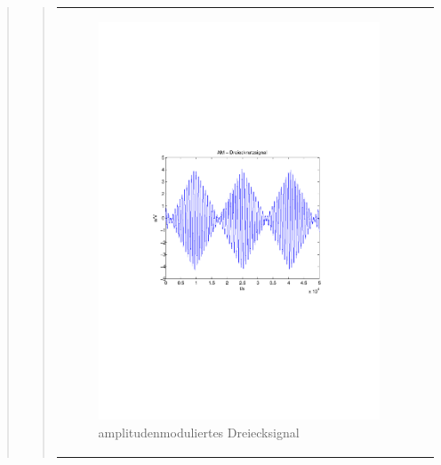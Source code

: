 \begin{quote}
\begin{quote}
\begin{center}
\begin{tabular}{ll}
\begin{minipage}{0.6\textwidth}
                     \begin{figure}[H]
                        \label{fig:}
                        \includegraphics[scale=0.5, trim = 2cm 6.5cm 1.5cm
                        8.5cm, clip]{./Bilder/am-dreieck} %
                        \caption{amplitudenmoduliertes Dreiecksignal}
                    \end{figure}
               \vspace{-1.5em}

                \end{minipage}

            \end{tabular}
            \end{center}
            

\end{quote}
\end{quote}
